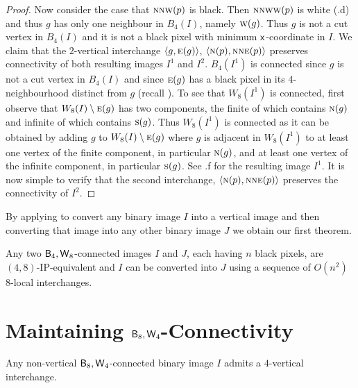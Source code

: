 \documentclass[lotsofwhite,charterfonts]{patmorin}
\newcommand{\foureight}{\ensuremath{\protect\textup{\textsf{B}}_{4},\protect\textup{\textsf{W}}_{8}}}
\newcommand{\eightfour}{\ensuremath{\protect\textup{\textsf{B}}_{8},\protect\textup{\textsf{W}}_{4}}}
\newcommand{\N}{\textsc{n}}
\newcommand{\NE}{\textsc{ne}}
\newcommand{\E}{\textsc{e}}
\renewcommand{\S}{\textsc{s}}
\newcommand{\W}{\textsc{w}}
\newcommand{\NW}{\textsc{nw}}
\newcommand{\x}{\ensuremath{\protect\textup{\textsf{x}}}}
\newcommand{\ic}[2]{\langle #1,#2 \rangle}
\newcommand{\sm}{\ensuremath{\setminus}}
\begin{document}
\begin{proof}
Now consider the case that $\N\NW(p)$ is black. Then $\N\NW\W(p)$ is white (.d) and thus $g$ has only one neighbour in $B_4(I)$, namely $\W(g)$. Thus $g$ is not a cut vertex in $B_4(I)$ and it is not a black pixel with minimum \x-coordinate in $I$. We claim that the $2$-vertical interchange $\ic{g}{\E(g)}$, $\ic{\N(p)}{\N\NE(p)}$ preserves connectivity of both resulting images $I^1$ and $I^2$. $B_4(I^1)$ is connected since $g$ is not a cut vertex in $B_4(I)$ and since $\E(g)$ has a black pixel in its $4$-neighbourhood distinct from $g$ (recall ). To see that $W_8(I^1)$ is connected, first observe that $W_8(I)\sm \E(g)$  has two components, the finite of which contains $\N(g)$ and infinite of which contains $\S(g)$. Thus $W_8(I^1)$ is connected as it can be obtained by adding $g$ to $W_8(I)\sm \E(g)$  where $g$ is adjacent in $W_8(I^1)$ to at least one vertex of the finite component, in particular $\N(g)$, and at least one vertex of the infinite component, in particular $\S(g)$. See .f for the resulting image $I^1$. It is now simple to verify that the second interchange, $\ic{\N(p)}{\N\NE(p)}$ preserves the connectivity of $I^2$.
\end{proof}

By applying  to convert any binary image $I$ into a
vertical image and then converting that image  into any
other binary image $J$ we obtain our first theorem.

\begin{thm}
Any two \foureight-connected images $I$ and $J$, each having $n$ black
pixels, are $(4,8)$-IP-equivalent and $I$ can be converted into $J$ using a
sequence of $O(n^2)$ 8-local interchanges.
\end{thm}
 



\section{Maintaining \eightfour-Connectivity}


\begin{lem}
Any  non-vertical $\eightfour$-connected binary image $I$ admits a $4$-vertical interchange.
\end{lem}
\end{document}

